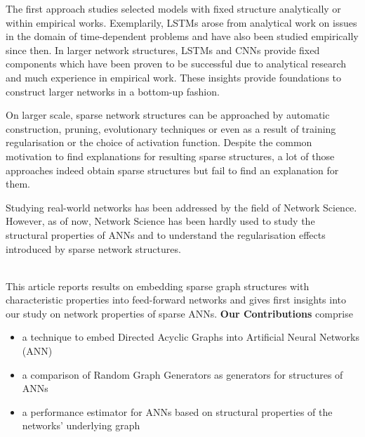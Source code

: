 \documentclass[runningheads]{llncs}
\begin{document}
The first approach studies selected models with fixed structure analytically or within empirical works.
Exemplarily, LSTMs arose from analytical work \cite{hochreiter1991untersuchungen} on issues in the domain of time-dependent problems and have also been studied empirically since then.
In larger network structures, LSTMs and CNNs provide fixed components which have been proven to be successful due to analytical research and much experience in empirical work.
These insights provide foundations to construct larger networks in a bottom-up fashion.

On larger scale, sparse network structures can be approached by automatic construction, pruning, evolutionary techniques or even as a result of training regularisation or the choice of activation function.
Despite the common motivation to find explanations for resulting sparse structures, a lot of those approaches indeed obtain sparse structures but fail to find an explanation for them.

Studying real-world networks has been addressed by the field of Network Science.
However, as of now, Network Science has been hardly used to study the structural properties of ANNs and to understand the regularisation effects introduced by sparse network structures.

~\\
\noindent This article reports results on embedding sparse graph structures with characteristic properties into feed-forward networks and gives first insights into our study on network properties of sparse ANNs.
\textbf{Our Contributions} comprise
\begin{itemize}
	\item a technique to embed Directed Acyclic Graphs into Artificial Neural Networks (ANN)
	\item a comparison of Random Graph Generators as generators for structures of ANNs
	\item a performance estimator for ANNs based on structural properties of the networks' underlying graph
\end{itemize}
\end{document}

